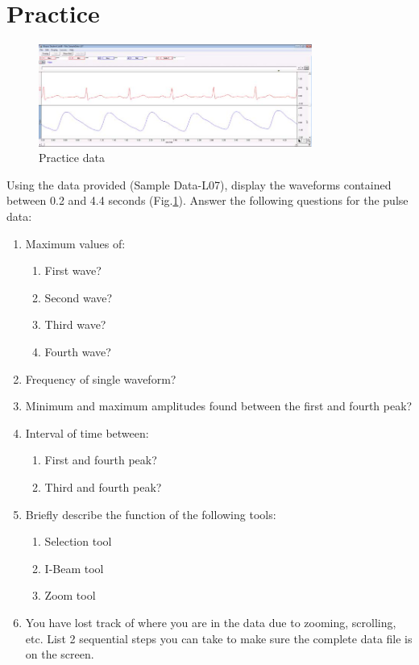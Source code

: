 \documentclass{article}
\begin{document}
\section*{Practice}
	\begin{figure}[h]
		\includegraphics[width=0.8\textwidth]{../images/BIOPAC_15.jpg}
		\centering
		\caption{Practice data}
		\label{practice}
		\end{figure}
	
Using the data provided (Sample Data-L07), display the waveforms contained between 0.2 and 4.4 seconds (Fig.\ref{practice}). Answer the following questions for the pulse data:
		\begin{enumerate}
			\item Maximum values of:
				\begin{enumerate}
					\item First wave?
					\item Second wave?
					\item Third wave?
					\item Fourth wave?
				\end{enumerate}
			\item Frequency of single waveform?
			\item Minimum and maximum amplitudes found between the first and fourth peak?
			\item Interval of time between:
				\begin{enumerate}
					\item First and fourth peak?
					\item Third and fourth peak?
				\end{enumerate}
			\item Briefly describe the function of the following tools:
				\begin{enumerate}
					\item Selection tool
					\item I-Beam tool
					\item Zoom tool
				\end{enumerate}
			\item You have lost track of where you are in the data due to zooming, scrolling, etc. List 2 sequential steps you can take to make sure the complete data file is on the screen.
		\end{enumerate}
\end{document}
